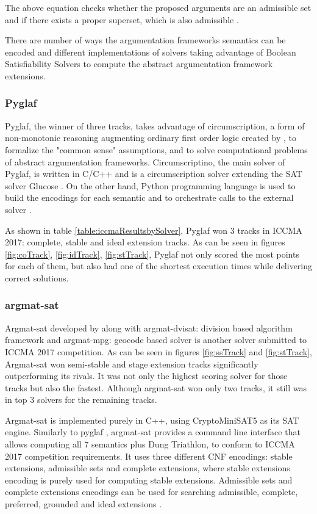 The above equation checks whether the proposed arguments are an admissible set and if there exists a proper superset, which is also admissible \citep{solvingMethods}.

There are number of ways the argumentation frameworks semantics can be encoded and different implementations of solvers taking advantage of Boolean Satisfiability Solvers to compute the abstract argumentation framework extensions. 

\subsubsection{Pyglaf} \label{section:pyglaf}
Pyglaf, the winner of three tracks, takes advantage of circumscription, a form of non-monotonic reasoning augmenting ordinary first order logic created by \citet{circumpscription}, to formalize the "common sense" assumptions, and to solve computational problems of abstract argumentation frameworks.  Circumscriptino, the main solver of Pyglaf, is written in C/C++ and is a circumscription solver extending the SAT solver Glucose \citep{glucose}. On the other hand, Python programming language is used to build the encodings for each semantic and to orchestrate calls to the external solver \citep{pyglaf}. 

As shown in table \ref{table:iccmaResultsbySolver}, Pyglaf won 3 tracks in ICCMA 2017: complete, stable and ideal extension tracks. As can be seen in figures \ref{fig:coTrack}, \ref{fig:idTrack}, \ref{fig:stTrack}, Pyglaf not only scored the most points for each of them, but also had one of the shortest execution times while delivering correct solutions.

\subsubsection{argmat-sat}
Argmat-sat developed by \citet{argmatSat} along with argmat-dvisat: division based algorithm framework \citep{argmatDvisat} and argmat-mpg: geocode based solver is another solver submitted to ICCMA 2017 competition. As can be seen in figures \ref{fig:ssTrack} and \ref{fig:stTrack}, Argmat-sat won semi-stable and stage extension tracks significantly outperforming its rivals. It was not only the highest scoring solver for those tracks but also the fastest. Although argmat-sat won only two tracks, it still was in top 3 solvers for the remaining tracks.

Argmat-sat is implemented purely in C++, using CryptoMiniSAT5 \citep{CryptoMiniSat} as its SAT engine. Similarly to pyglaf \citep{pyglaf}, argmat-sat provides a command line interface that allows computing all 7 semantics plus Dung Triathlon, to conform to ICCMA 2017 competition requirements. It uses three different CNF encodings: stable extensions, admissible sets and complete extensions, where stable extensions encoding is purely used for computing stable extensions. Admissible sets and complete extensions encodings can be used for searching admissible, complete, preferred, grounded and ideal extensions \citep{argmatSat}. 

